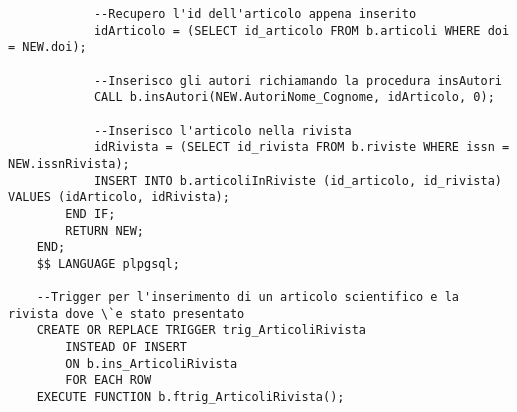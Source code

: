 \begin{lstlisting}
            --Recupero l'id dell'articolo appena inserito
            idArticolo = (SELECT id_articolo FROM b.articoli WHERE doi = NEW.doi);
    
            --Inserisco gli autori richiamando la procedura insAutori
            CALL b.insAutori(NEW.AutoriNome_Cognome, idArticolo, 0);
    
            --Inserisco l'articolo nella rivista
            idRivista = (SELECT id_rivista FROM b.riviste WHERE issn = NEW.issnRivista);
            INSERT INTO b.articoliInRiviste (id_articolo, id_rivista) VALUES (idArticolo, idRivista);
        END IF;
        RETURN NEW;
    END;
    $$ LANGUAGE plpgsql;
    
    --Trigger per l'inserimento di un articolo scientifico e la rivista dove \`e stato presentato
    CREATE OR REPLACE TRIGGER trig_ArticoliRivista
        INSTEAD OF INSERT
        ON b.ins_ArticoliRivista
        FOR EACH ROW
    EXECUTE FUNCTION b.ftrig_ArticoliRivista();
\end{lstlisting}

